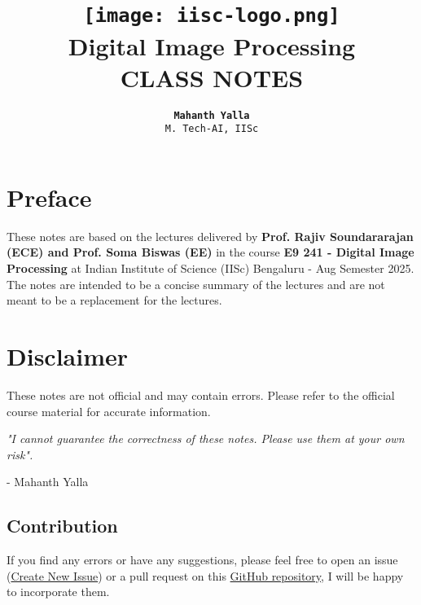 \documentclass{report}
\title{
    \vspace{-2cm} %
    \texttt{[image: iisc-logo.png]}\\ %
    \vspace{1cm} %
    {\huge \textbf{Digital Image Processing}}\\
    \vspace{0.5cm} %
    \textsf{\large CLASS NOTES}
}
\author{\LARGE{\textbf{\texttt{Mahanth Yalla}}}\\ \texttt{\large M. Tech-AI, IISc} 
}
\date{}
\begin{document}
\begin{titlepage}
    \centering
    \maketitle
\end{titlepage}

\newpage
{}

\section*{Preface}
These notes are based on the lectures delivered by {\bf Prof. Rajiv Soundararajan (ECE) and Prof. Soma Biswas (EE)} in the course {\bf E9 241 - Digital Image Processing} 
at Indian Institute of Science (IISc) Bengaluru - Aug Semester 2025. 
The notes are intended to be a concise summary of the lectures and are not meant to be a replacement for the lectures. 

\section*{Disclaimer}
These notes are not official and may contain errors. Please refer to the official course material for accurate information.

\textit{"I cannot guarantee the correctness of these notes. Please use them at your own risk".}

\hfill- Mahanth Yalla 



\subsection*{Contribution}
If you find any errors or have any suggestions, please feel free to open an issue (\href{https://github.com/Mahanth-Maha/DIP-E9241-2025/issues/new/choose}{Create New Issue}) or a pull request on this \href{https://github.com/Mahanth-Maha/DIP-E9241-2025/}{GitHub repository}, I will be happy to incorporate them.
\end{document}
